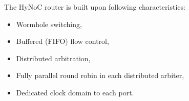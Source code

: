 The HyNoC router is built upon following characteristics:

\begin{itemize}
    \item Wormhole switching,
    \item Buffered (FIFO) flow control,
    \item Distributed arbitration,
    \item Fully parallel round robin in each distributed arbiter,
    \item Dedicated clock domain to each port.
\end{itemize}

